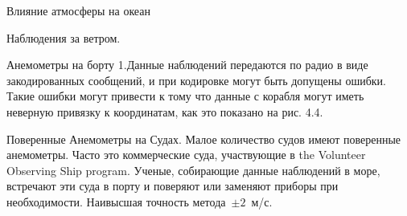 \begin{chapter}{Влияние атмосферы на океан}
\begin{section}{Наблюдения за ветром.}
\begin{paragraph}{Анемометры на борту}
1.Данные наблюдений передаются по радио в виде закодированных
  сообщений, и при кодировке могут быть допущены ошибки. Такие ошибки
  могут привести к тому что данные с корабля могут иметь неверную
  привязку к координатам, как это показано на рис. 4.4.

%
\end{paragraph}

\begin{paragraph}{Поверенные Анемометры на Судах.}
Малое количество судов имеют поверенные анемометры. Часто это
коммерческие суда, участвующие в the Volunteer Observing Ship
program. Ученые, собирающие данные наблюдений в море, встречают эти
суда в порту и поверяют или заменяют приборы при
необходимости. Наивысшая точность метода~$\pm 2$~м/с.  
\end{paragraph}


\end{section}
\end{chapter}
